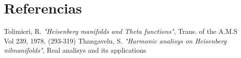 \documentclass[12pt]{article}
\begin{document}
 \section{Referencias}
  \begin{thebibliography}{1}
   Tolimieri, R.   \emph{"Heisenberg manifolds and Theta functions"}, Trans. of the A.M.S Vol 239, 1978. (293-319)
   Thangavelu, S.  \emph{"Harmonic analisys on Heisenberg nilmanifolds"}, Real analisys and its applications
  \end{thebibliography}
\end{document}
